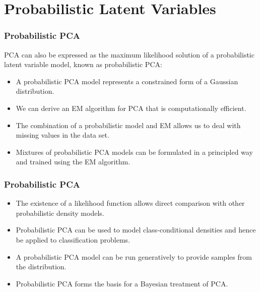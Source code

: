 \documentclass{beamer}
\begin{document}
\section{Probabilistic Latent Variables}

\begin{frame}
    \frametitle{Probabilistic PCA}
    PCA can also be expressed as the maximum likelihood solution of a probabilistic latent variable model, known as probabilistic PCA:
    \begin{itemize}
        \item A probabilistic PCA model represents a constrained form of a Gaussian distribution.
        \item We can derive an EM algorithm for PCA that is computationally efficient.
        \item The combination of a probabilistic model and EM allows us to deal with missing values in the data set.
        \item Mixtures of probabilistic PCA models can be formulated in a principled way and trained using the EM algorithm.
    \end{itemize}
\end{frame}

\begin{frame}
    \frametitle{Probabilistic PCA}
    \begin{itemize}
        \item The existence of a likelihood function allows direct comparison with other probabilistic density models.
        \item Probabilistic PCA can be used to model class-conditional densities and hence be applied to classification problems.
        \item A probabilistic PCA model can be run generatively to provide samples from the distribution.
        \item Probabilistic PCA forms the basis for a Bayesian treatment of PCA.
    \end{itemize}
\end{frame}
\end{document}
